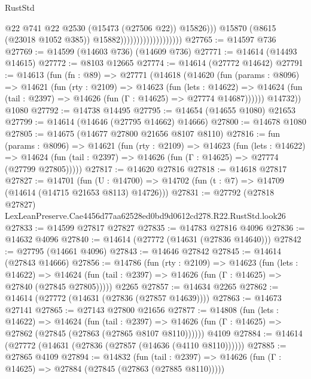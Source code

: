 \begin{lexlean}{RustStd}
\begin{coremodule}
                                                @22
                                                @741
                                                @22
                                                @2530
                                                (@15473 (@27506 @22))
                                                @15826)))
                                          @15870
                                          (@8615 (@23018 @1052 @385))
                                          @15882)))))))))))))))))))
@27765 := @14597 @736
@27769 := @14599 (@14603 @736) (@14609 @736)
@27771 := @14614 (@14493 @14615)
@27772 := @8103 @12665
@27774 := @14614 (@27772 @14642)
@27791 := @14613
    (fun (fn : @89) =>
    @27771
      (@14618
        (@14620
          (fun (params : @8096) =>
          @14621
            (fun (rty : @2109) =>
            @14623
              (fun (lets : @14622) =>
              @14624 (fun (tail : @2397) => @14626 (fun (Γ : @14625) => @27774 @14687))))))
        @14732))
    @1080
@27792 := @14738 @14495
@27795 := @14654 (@14655 @1080) @21653
@27799 := @14614 (@14646 (@27795 @14662) @14666)
@27800 := @14678 @1080
@27805 := @14675 (@14677 @27800 @21656 @8107 @8110)
@27816 := fun (params : @8096) =>
  @14621
    (fun (rty : @2109) =>
    @14623
      (fun (lets : @14622) =>
      @14624 (fun (tail : @2397) => @14626 (fun (Γ : @14625) => @27774 (@27799 @27805)))))
@27817 := @14620 @27816
@27818 := @14618 @27817
@27827 := @14701
    (fun (U : @14700) => @14702 (fun (t : @7) => @14709 (@14614 (@14715 @21653 @8113) @14726)))
@27831 := @27792
    (@27818 @27827)
    LexLeanPreserve.Cae4456d77aa62528ed0bd9d0612cd278.R22.RustStd.look26
@27833 := @14599 @27817 @27827
@27835 := @14783 @27816 @4096
@27836 := @14632 @4096
@27840 := @14614 (@27772 (@14631 (@27836 @14640)))
@27842 := @27795 (@14661 @4096)
@27843 := @14646 @27842
@27845 := @14614 (@27843 @14666)
@27856 := @14786
    (fun (rty : @2109) =>
    @14623
      (fun (lets : @14622) =>
      @14624 (fun (tail : @2397) => @14626 (fun (Γ : @14625) => @27840 (@27845 @27805)))))
    @2265
@27857 := @14634 @2265
@27862 := @14614 (@27772 (@14631 (@27836 (@27857 @14639))))
@27863 := @14673 @27141
@27865 := @27143 @27800 @21656
@27877 := @14808
    (fun (lets : @14622) =>
    @14624
      (fun (tail : @2397) =>
      @14626 (fun (Γ : @14625) => @27862 (@27845 (@27863 (@27865 @8107 @8110))))))
    @4109
@27884 := @14614 (@27772 (@14631 (@27836 (@27857 (@14636 (@4110 @8110))))))
@27885 := @27865 @4109
@27894 := @14832
    (fun (tail : @2397) => @14626 (fun (Γ : @14625) => @27884 (@27845 (@27863 (@27885 @8110)))))

\end{coremodule}
\end{lexlean}
